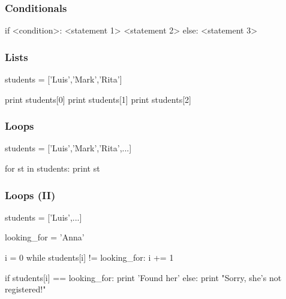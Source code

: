 \begin{frame}[fragile]
\frametitle{Conditionals}

\begin{python}

if <condition>:
    <statement 1>
    <statement 2>
else:
    <statement 3>

\end{python}
\end{frame}

\begin{frame}[fragile]
\frametitle{Lists}

\begin{python}

students = ['Luis','Mark','Rita']

print students[0]
print students[1]
print students[2]
\end{python}

\end{frame}

\begin{frame}[fragile]
\frametitle{Loops}

\begin{python}
students = ['Luis','Mark','Rita',...]

for st in students:
    print st
\end{python}
\end{frame}

\begin{frame}[fragile]
\frametitle{Loops (II)}

\begin{python}

students = ['Luis',...]

looking_for = 'Anna'

i = 0
while students[i] != looking_for:
    i += 1

if students[i] == looking_for:
    print 'Found her'
else:
    print "Sorry, she's not registered!"
\end{python}

\end{frame}


